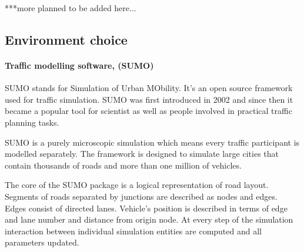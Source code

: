 \documentclass[11pt,english]{article}
\begin{document}
***more planned to be added here...



















\subsection{Environment choice}

\paragraph{Traffic modelling software, (SUMO)}

SUMO stands for Simulation of Urban MObility. It's an open source framework used for traffic simulation\citep{krajzewicz2002sumo}. SUMO was first introduced in 2002 and since then it became a popular tool for scientist as well as people involved in practical traffic planning tasks. 

SUMO is a purely microscopic simulation which means every traffic participant is modelled separately. The framework is designed to simulate large cities that contain thousands of roads and more than one million of vehicles.

The core of the SUMO package is a logical representation of road layout. Segments of roads separated by junctions are described as nodes and edges. Edges consist of directed lanes. Vehicle's position is described in terms of edge and lane number and distance from origin node. At every step of the simulation interaction between individual simulation entities are computed and all parameters updated. 
\citep{krajzewicz2002sumo}
\end{document}
